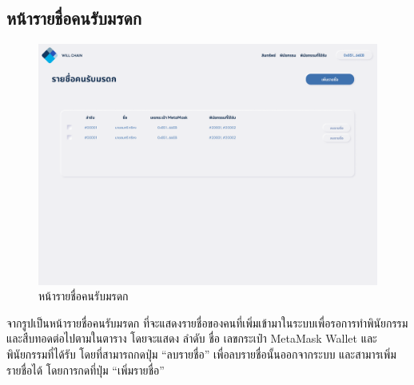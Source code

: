 \documentclass[12pt,oneside,openright,a4paper]{cpe-thai-project}
\begin{document}
\subsection{หน้ารายชื่อคนรับมรดก}
		\begin{figure}[!thb]
			\centering
			\includegraphics[scale=0.2]{heirAccount}
			\caption{หน้ารายชื่อคนรับมรดก}
		\end{figure}
		\FloatBarrier
		\tab จากรูปเป็นหน้ารายชื่อคนรับมรดก ที่จะแสดงรายชื่อของคนที่เพิ่มเข้ามาในระบบเพื่อรอการทำพินัยกรรมและสืบทอดต่อไปตามในตาราง โดยจะแสดง ลำดับ ชื่อ เลขกระเป๋า MetaMask Wallet และพินัยกรรมที่ได้รับ โดยที่สามารถกดปุ่ม “ลบรายชื่อ” เพื่อลบรายชื่อนั้นออกจากระบบ และสามารเพิ่มรายชื่อได้ โดยการกดที่ปุ่ม “เพิ่มรายชื่อ”
\end{document}

